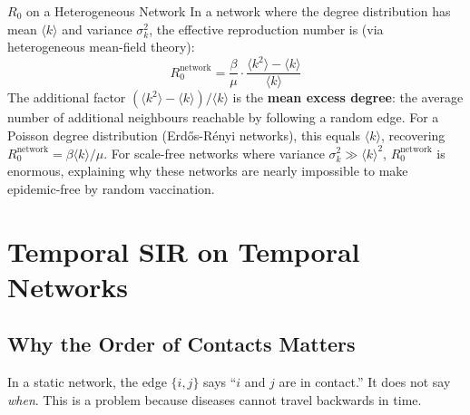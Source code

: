 \begin{keyinsight}{$R_0$ on a Heterogeneous Network}
In a network where the degree distribution has mean $\langle k \rangle$ and variance $\sigma_k^2$, the effective reproduction number is (via heterogeneous mean-field theory):
\begin{equation}
    R_0^{\mathrm{network}} = \frac{\beta}{\mu} \cdot \frac{\langle k^2 \rangle - \langle k \rangle}{\langle k \rangle}
    \label{eq:r0_network}
\end{equation}
The additional factor $(\langle k^2 \rangle - \langle k \rangle)/\langle k \rangle$ is the \textbf{mean excess degree}: the average number of additional neighbours reachable by following a random edge. For a Poisson degree distribution (Erd\H{o}s-R\'enyi networks), this equals $\langle k \rangle$, recovering $R_0^{\mathrm{network}} = \beta \langle k \rangle / \mu$. For scale-free networks where variance $\sigma_k^2 \gg \langle k \rangle^2$, $R_0^{\mathrm{network}}$ is enormous, explaining why these networks are nearly impossible to make epidemic-free by random vaccination.
\end{keyinsight}

\section{Temporal SIR on Temporal Networks}
\label{sec:temporal_sir}

\subsection{Why the Order of Contacts Matters}

In a static network, the edge $\{i, j\}$ says ``$i$ and $j$ are in contact.'' It does not say \emph{when}. This is a problem because diseases cannot travel backwards in time.

